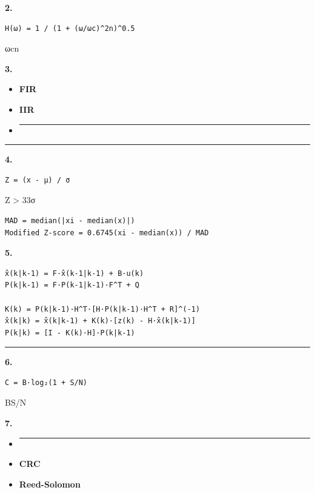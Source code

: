 \textbf{2. }

\begin{verbatim}
H(ω) = 1 / (1 + (ω/ωc)^2n)^0.5
\end{verbatim}

ωcn

\textbf{3. }

\begin{itemize}
\item
  \textbf{FIR}
\item
  \textbf{IIR}
\item
  \begin{center}\rule{0.5\linewidth}{0.5pt}\end{center}
\end{itemize}

\begin{center}\rule{0.5\linewidth}{0.5pt}\end{center}

\textbf{4. }

\begin{verbatim}
Z = (x - μ) / σ
\end{verbatim}

\textbar Z\textbar{} \textgreater{} 33σ

\begin{verbatim}
MAD = median(|xi - median(x)|)
Modified Z-score = 0.6745(xi - median(x)) / MAD
\end{verbatim}

\textbf{5. }

\begin{verbatim}
x̂(k|k-1) = F·x̂(k-1|k-1) + B·u(k)
P(k|k-1) = F·P(k-1|k-1)·F^T + Q

K(k) = P(k|k-1)·H^T·[H·P(k|k-1)·H^T + R]^(-1)
x̂(k|k) = x̂(k|k-1) + K(k)·[z(k) - H·x̂(k|k-1)]
P(k|k) = [I - K(k)·H]·P(k|k-1)
\end{verbatim}

\begin{center}\rule{0.5\linewidth}{0.5pt}\end{center}

\textbf{6. }

\begin{verbatim}
C = B·log₂(1 + S/N)
\end{verbatim}

BS/N

\textbf{7. }

\begin{itemize}
\item
  \begin{center}\rule{0.5\linewidth}{0.5pt}\end{center}
\item
  \textbf{CRC}
\item
  \textbf{Reed-Solomon}
\end{itemize}


